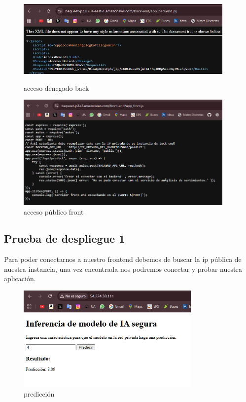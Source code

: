 \documentclass{article}
\begin{document}
	\begin{figure}[H]
	\centering
	\includegraphics[width=0.95\textwidth]{acceso_denegado_back.png}
	\caption{acceso denegado back}
	\includegraphics[width=0.95\textwidth]{acceso_publico_front.png}
	\caption{acceso público front}
	\end{figure}

	\newpage

	\subsection{Prueba de despliegue 1}
	Para poder conectarnos a nuestro frontend debemos de buscar la ip pública de nuestra instancia, una vez encontrada nos podremos conectar y probar nuestra aplicación.
	\begin{figure}[H]
	\centering
	\includegraphics[width=0.8\textwidth]{prediccion_completada.png}
	\caption{predicción}
	\end{figure}
\end{document}
